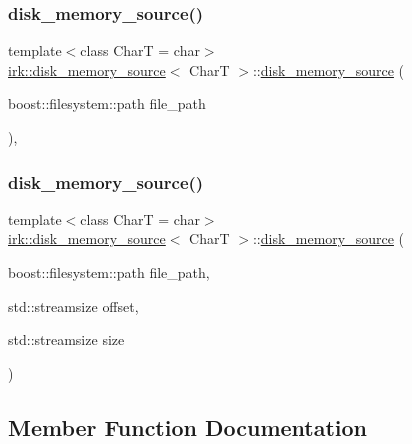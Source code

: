 \subsubsection{\texorpdfstring{disk\+\_\+memory\+\_\+source()}{disk\_memory\_source()}\hspace{0.1cm}{\footnotesize\ttfamily [4/5]}}
{\footnotesize\ttfamily template$<$class CharT  = char$>$ \\
\mbox{\hyperlink{classirk_1_1disk__memory__source}{irk\+::disk\+\_\+memory\+\_\+source}}$<$ CharT $>$\+::\mbox{\hyperlink{classirk_1_1disk__memory__source}{disk\+\_\+memory\+\_\+source}} (\begin{DoxyParamCaption}\item[{boost\+::filesystem\+::path}]{file\+\_\+path }\end{DoxyParamCaption})\hspace{0.3cm}{\ttfamily [inline]}, {\ttfamily [explicit]}}

\mbox{\label{classirk_1_1disk__memory__source_a5b908030dd3a3f288127be13b2d878d8}} 
\subsubsection{\texorpdfstring{disk\+\_\+memory\+\_\+source()}{disk\_memory\_source()}\hspace{0.1cm}{\footnotesize\ttfamily [5/5]}}
{\footnotesize\ttfamily template$<$class CharT  = char$>$ \\
\mbox{\hyperlink{classirk_1_1disk__memory__source}{irk\+::disk\+\_\+memory\+\_\+source}}$<$ CharT $>$\+::\mbox{\hyperlink{classirk_1_1disk__memory__source}{disk\+\_\+memory\+\_\+source}} (\begin{DoxyParamCaption}\item[{boost\+::filesystem\+::path}]{file\+\_\+path,  }\item[{std\+::streamsize}]{offset,  }\item[{std\+::streamsize}]{size }\end{DoxyParamCaption})\hspace{0.3cm}{\ttfamily [inline]}}



\subsection{Member Function Documentation}
\mbox{\label{classirk_1_1disk__memory__source_a7ce46af8d31725e5266cb02cf433c524}} 
